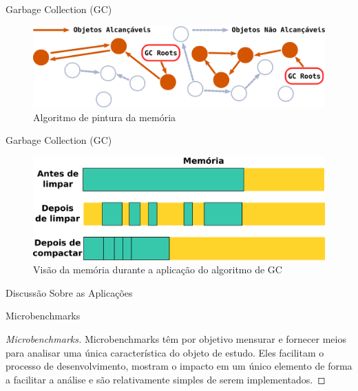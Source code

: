 \documentclass[xcolor={usenames,svgnames,dvipsnames},brazil,english,12pt,aspectratio=149]{beamer}
\begin{document}
\begin{frame}{Garbage Collection (GC)}
  \begin{figure}[!h]
    \centering
    \includegraphics[width=\textwidth]{gc_algoritmo}
    \caption*{Algoritmo de pintura da memória}
  \end{figure}
\end{frame}

\begin{frame}{Garbage Collection (GC)}
  \begin{figure}[!h]
    \centering
    \includegraphics[width=\textwidth]{gc_memory}
    \caption*{Visão da memória durante a aplicação do algoritmo de GC}
  \end{figure}
\end{frame}

\begin{frame}{Discussão Sobre as Aplicações}
  
\end{frame}

\begin{frame}{Microbenchmarks}
  \begin{proof}[Microbenchmarks]
Microbenchmarks têm por objetivo mensurar e fornecer meios para analisar uma
única característica do objeto de estudo. Eles facilitam o processo de
desenvolvimento, mostram o impacto em um único elemento de forma a facilitar a
análise e são relativamente simples de serem implementados.
  \end{proof}

\end{frame}
\end{document}
